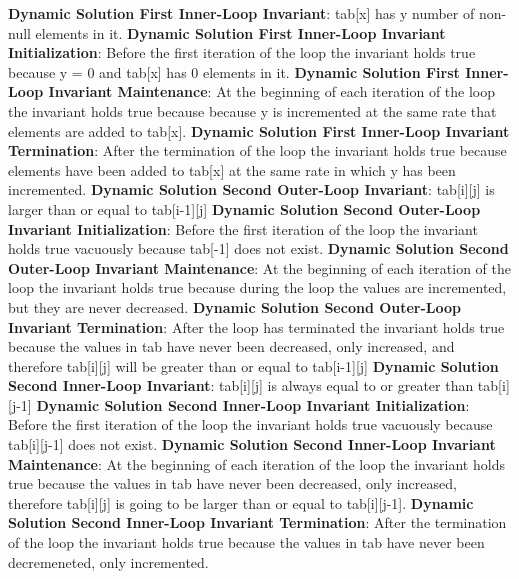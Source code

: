 \documentclass[onecolumn, 12pt, article]{IEEEtran}
\numberwithin{case}{problem}
\numberwithin{condition}{problem}
\numberwithin{condition}{subsection}
\numberwithin{definition}{section}
\theoremstyle{remark}
\numberwithin{question}{problem}
\theoremstyle{plain}
\numberwithin{answer}{problem}
\numberwithin{solution}{section}
\numberwithin{equation}{section}%
\begin{document}
\textbf{Dynamic Solution First Inner-Loop Invariant}: tab[x] has y number of non-null elements in it.
\newline
\textbf{Dynamic Solution First Inner-Loop Invariant Initialization}: Before the first iteration of the loop the invariant holds true because y = 0 and tab[x] has 0 elements in it.
\newline
\textbf{Dynamic Solution First Inner-Loop Invariant Maintenance}: At the beginning of each iteration of the loop the invariant holds true because because y is incremented at the same rate that elements are added to tab[x].
\newline
\textbf{Dynamic Solution First Inner-Loop Invariant Termination}: After the termination of the loop the invariant holds true because elements have been added to tab[x] at the same rate in which y has been incremented.
\newline
\newline
\textbf{Dynamic Solution Second Outer-Loop Invariant}: tab[i][j] is larger than or equal to tab[i-1][j]
\newline
\textbf{Dynamic Solution Second Outer-Loop Invariant Initialization}: Before the first iteration of the loop the invariant holds true vacuously because tab[-1] does not exist.
\newline
\textbf{Dynamic Solution Second Outer-Loop Invariant Maintenance}: At the beginning of each iteration of the loop the invariant holds true because during the loop the values are incremented, but they are never decreased.
\newline
\textbf{Dynamic Solution Second Outer-Loop Invariant Termination}: After the loop has terminated the invariant holds true because the values in tab have never been decreased, only increased, and therefore tab[i][j] will be greater than or equal to tab[i-1][j]
\newline
\newline
\textbf{Dynamic Solution Second Inner-Loop Invariant}: tab[i][j] is always equal to or greater than tab[i][j-1]
\newline
\textbf{Dynamic Solution Second Inner-Loop Invariant Initialization}: Before the first iteration of the loop the invariant holds true vacuously because tab[i][j-1] does not exist.
\newline
\textbf{Dynamic Solution Second Inner-Loop Invariant Maintenance}: At the beginning of each iteration of the loop the invariant holds true because the values in tab have never been decreased, only increased, therefore tab[i][j] is going to be larger than or equal to tab[i][j-1].
\newline
\textbf{Dynamic Solution Second Inner-Loop Invariant Termination}: After the termination of the loop the invariant holds true because the values in tab have never been decremeneted, only incremented.
\newline
\newline
\end{document}

